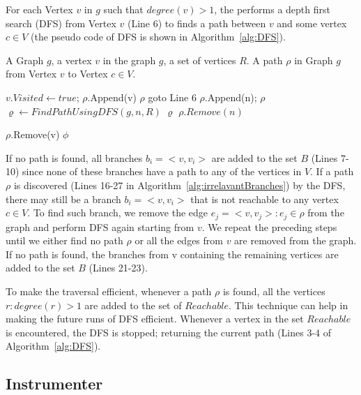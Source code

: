 For each Vertex $v$ in $g$ such that $degree(v) > 1$, the  performs a depth first search (DFS) from Vertex $v$ (Line 6) to finds a path between $v$ and some vertex $c \in V$ (the pseudo code of DFS is shown in Algorithm~\ref{alg:DFS}).
\newcommand{\DFS}{\ensuremath{\mbox{\sc DFS}}}
\begin{algorithm}[h!]
\caption{$FindPathUsingDFS(g, v, R)$}\label{alg:DFS}
\begin{algorithmic}[1]
\REQUIRE A Graph $g$, a vertex $v$ in the graph $g$, a set of vertices $R$.
\ENSURE A path $\rho$ in Graph $g$ from Vertex $v$ to Vertex $c \in V$.

\medskip

\STATE $v.Visited \leftarrow true$;
\STATE $\rho$.Append(v)
	\RETURN $\rho$
\ENDIF	
{}
		\STATE goto Line 6 
	\ENDIF
	\STATE $\rho$.Append(n);
		\RETURN $\rho$
	\ENDIF
	\STATE $\varrho \leftarrow FindPathUsingDFS(g, n, R)$
	  \RETURN $\varrho$
	\ENDIF
	\STATE $\rho.Remove(n)$

\ENDFOR
\STATE $\rho$.Remove(v)
\RETURN $\phi$
\label{alg:ICFG}
\end{algorithmic}
\end{algorithm}
If no path is found, all branches $b_i = <v, v_i>$ are added to the set $B$ (Lines 7-10) since none of these branches have a path to any of the vertices in $V$. If a path $\rho$ is discovered (Lines 16-27 in Algorithm~\ref{alg:irrelavantBranches}) by the DFS, there may still be a branch $b_i = <v, v_i>$ that is not reachable to any vertex $c \in V$. To find such branch, we remove the edge $e_j=<v, v_j>: e_j \in \rho$ from the graph and perform DFS again starting from $v$. We repeat the preceding steps until we either find no path $\rho$ or all the edges from $v$ are removed from the graph. If no path is found, the branches from v containing the remaining vertices are added to the set $B$ (Lines 21-23).

To make the traversal efficient, whenever a path $\rho$ is found, all the vertices $r: degree(r)>1$ are added to the set of $Reachable$. This technique can help in making the future runs of DFS efficient. Whenever a vertex in the set $Reachable$ is encountered, the DFS is stopped; returning the current path (Lines 3-4 of Algorithm~\ref{alg:DFS}).
 
\subsection{Instrumenter}

